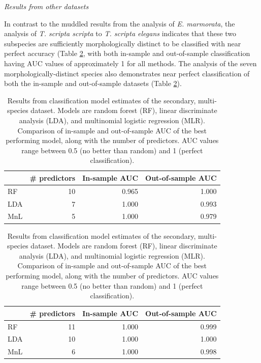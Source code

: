 \documentclass[12pt,letterpaper]{article}
\renewcommand{\subsection}[1]{%
\bigskip
\begin{center}
\begin{large}
\normalfont\itshape #1
\end{large}
\end{center}}
\begin{document}
\clearpage
\subsection{Results from other datasets}

In contrast to the muddled results from the analysis of \textit{E. marmorata}, the analysis of \textit{T. scripta scripta} to \textit{T. scripta elegans} indicates that these two subspecies are sufficiently morphologically distinct to be classified with near perfect accuracy (Table \ref{tab:second_res}, with both in-sample and out-of-sample classification having AUC values of approximately 1 for all methods. The analysis of the seven morphologically-distinct species also demonstrates near perfect classification of both the in-sample and out-of-sample datasets (Table \ref{tab:second_res}). 


\begin{table}[ht]
  \begin{subtable}[t]{\linewidth}
    \begin{tabular}{ l r r r }
      \hline
      & \# predictors & In-sample AUC & Out-of-sample AUC \\ 
      \hline
      \hline
      RF &   10 & 0.965 & 1.000 \\ 
      LDA &    7 & 1.000 & 0.993 \\ 
      MnL &    5 & 1.000 & 0.979 \\ 
      \hline
    \end{tabular}
  \end{subtable}

  \begin{subtable}[t]{\linewidth}
    \begin{tabular}{ l r r r }
      \hline
      & \# predictors & In-sample AUC & Out-of-sample AUC \\ 
      \hline
      \hline
      RF &   11 & 1.000 & 0.999 \\ 
      LDA &   10 & 1.000 & 1.000 \\ 
      MnL &    6 & 1.000 & 0.998 \\ 
      \hline
    \end{tabular}
  \end{subtable}
  \caption{Results from classification model estimates of the secondary, multi-species dataset. Models are random forest (RF), linear discriminate analysis (LDA), and multinomial logistic regression (MLR). Comparison of in-sample and out-of-sample AUC of the best performing model, along with the number of predictors. AUC values range between 0.5 (no better than random) and 1 (perfect classification).}
  \label{tab:second_res}
\end{table}
\end{document}
